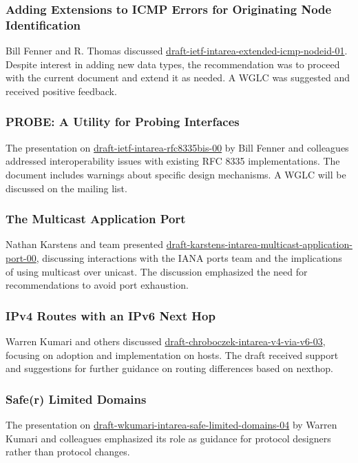 \documentclass{article}
\begin{document}
\subsubsection{Adding Extensions to ICMP Errors for Originating Node Identification}
Bill Fenner and R. Thomas discussed \href{https://datatracker.ietf.org/doc/html/draft-ietf-intarea-extended-icmp-nodeid-01}{draft-ietf-intarea-extended-icmp-nodeid-01}. Despite interest in adding new data types, the recommendation was to proceed with the current document and extend it as needed. A WGLC was suggested and received positive feedback.

\subsubsection{PROBE: A Utility for Probing Interfaces}
The presentation on \href{https://datatracker.ietf.org/doc/html/draft-ietf-intarea-rfc8335bis-00}{draft-ietf-intarea-rfc8335bis-00} by Bill Fenner and colleagues addressed interoperability issues with existing RFC 8335 implementations. The document includes warnings about specific design mechanisms. A WGLC will be discussed on the mailing list.

\subsubsection{The Multicast Application Port}
Nathan Karstens and team presented \href{https://datatracker.ietf.org/doc/html/draft-karstens-intarea-multicast-application-port-00}{draft-karstens-intarea-multicast-application-port-00}, discussing interactions with the IANA ports team and the implications of using multicast over unicast. The discussion emphasized the need for recommendations to avoid port exhaustion.

\subsubsection{IPv4 Routes with an IPv6 Next Hop}
Warren Kumari and others discussed \href{https://datatracker.ietf.org/doc/html/draft-chroboczek-intarea-v4-via-v6-03}{draft-chroboczek-intarea-v4-via-v6-03}, focusing on adoption and implementation on hosts. The draft received support and suggestions for further guidance on routing differences based on nexthop.

\subsubsection{Safe(r) Limited Domains}
The presentation on \href{https://datatracker.ietf.org/doc/html/draft-wkumari-intarea-safe-limited-domains-04}{draft-wkumari-intarea-safe-limited-domains-04} by Warren Kumari and colleagues emphasized its role as guidance for protocol designers rather than protocol changes.
\end{document}
